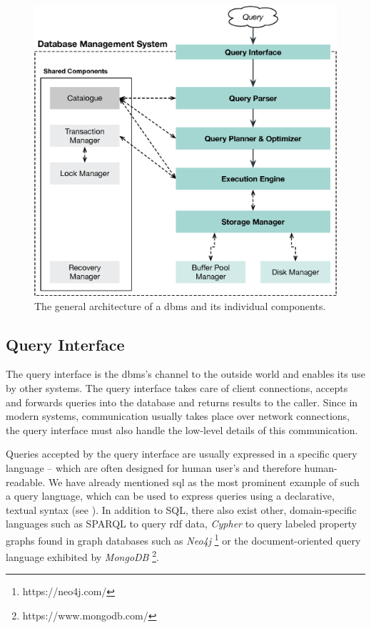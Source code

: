 \begin{figure}[tb]
    \centering
    \includegraphics[width=\textwidth]{figures/dbms-architecture.eps}
    \caption{The general architecture of a \acrshort{dbms} and its individual components.}
    \label{figure:dbms-architecture}
\end{figure}

\subsection{Query Interface}

The query interface is the \acrshort{dbms}'s channel to the outside world and enables its use by other systems. The query interface takes care of client connections, accepts and forwards queries into the database and returns results to the caller. Since in modern systems, communication usually takes place over network connections, the query interface must also handle the low-level details of this communication.

Queries accepted by the query interface are usually expressed in a specific query language -- which are often designed for human user's and therefore human-readable. We have already mentioned \acrshort{sql} \cite{Chamberlin:2012Early} as the most prominent example of such a query language, which can be used to express queries using a declarative, textual syntax (see ). In addition to SQL, there also exist other, domain-specific languages such as SPARQL \cite{Perez:2009Semantics} to query \acrfull{rdf} data, \emph{Cypher} to query labeled property graphs \cite{Francis:2018Cypher} found in graph databases such as \emph{Neo4j} \footnote{https://neo4j.com/} or the document-oriented query language exhibited by \emph{MongoDB} \footnote{https://www.mongodb.com/}.

